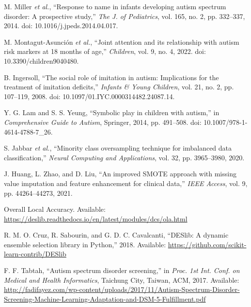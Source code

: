 \documentclass[conference]{IEEEtran}
\begin{document}
\begin{thebibliography}{99}
 M. Miller \textit{et al.}, ``Response to name in infants developing autism spectrum disorder: A prospective study,'' \textit{The J. of Pediatrics}, vol. 165, no. 2, pp. 332--337, 2014. doi: 10.1016/j.jpeds.2014.04.017.

 M. Montagut-Asunción \textit{et al.}, ``Joint attention and its relationship with autism risk markers at 18 months of age,'' \textit{Children}, vol. 9, no. 4, 2022. doi: 10.3390/children9040480.

 B. Ingersoll, ``The social role of imitation in autism: Implications for the treatment of imitation deficits,'' \textit{Infants \& Young Children}, vol. 21, no. 2, pp. 107--119, 2008. doi: 10.1097/01.IYC.0000314482.24087.14.

 Y. G. Lam and S. S. Yeung, ``Symbolic play in children with autism,'' in \textit{Comprehensive Guide to Autism}, Springer, 2014, pp. 491--508. doi: 10.1007/978-1-4614-4788-7\_26.

 S. Jabbar \textit{et al.}, ``Minority class oversampling technique for imbalanced data classification,'' \textit{Neural Computing and Applications}, vol. 32, pp. 3965--3980, 2020.

 J. Huang, L. Zhao, and D. Liu, ``An improved SMOTE approach with missing value imputation and feature enhancement for clinical data,'' \textit{IEEE Access}, vol. 9, pp. 44264--44273, 2021.

 Overall Local Accuracy. Available: \url{https://deslib.readthedocs.io/en/latest/modules/dcs/ola.html}

 R. M. O. Cruz, R. Sabourin, and G. D. C. Cavalcanti, ``DESlib: A dynamic ensemble selection library in Python,'' 2018. Available: \url{https://github.com/scikit-learn-contrib/DESlib}

 F. F. Tabtah, ``Autism spectrum disorder screening,'' in \textit{Proc. 1st Int. Conf. on Medical and Health Informatics}, Taichung City, Taiwan, ACM, 2017. Available: \url{http://fadifayez.com/wp-content/uploads/2017/11/Autism-Spectrum-Disorder-Screening-Machine-Learning-Adaptation-and-DSM-5-Fulfillment.pdf}

\end{thebibliography}
\end{document}
